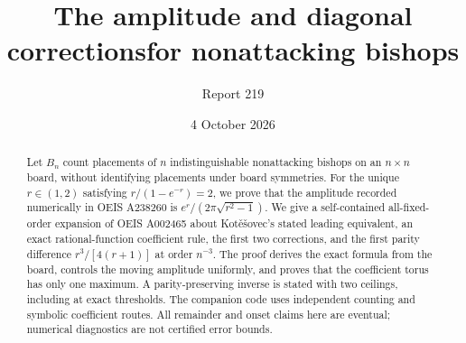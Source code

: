 \documentclass[11pt,letterpaper]{article}
\title{The amplitude and diagonal corrections\newline for nonattacking bishops}
\author{Report 219}
\date{4 October 2026}
\theoremstyle{remark}\newtheorem{remark}[theorem]{Remark}
\begin{document}
\maketitle
\begin{abstract}
Let $B_n$ count placements of $n$ indistinguishable nonattacking bishops on an $n\times n$ board, without identifying placements under board symmetries. For the unique $r\in(1,2)$ satisfying $r/(1-e^{-r})=2$, we prove that the amplitude recorded numerically in OEIS A238260 is $e^r/(2\pi\sqrt{r^2-1})$. We give a self-contained all-fixed-order expansion of OEIS A002465 about Kot\v e\v sovec's stated leading equivalent, an exact rational-function coefficient rule, the first two corrections, and the first parity difference $r^3/[4(r+1)]$ at order $n^{-3}$. The proof derives the exact formula from the board, controls the moving amplitude uniformly, and proves that the coefficient torus has only one maximum. A parity-preserving inverse is stated with two ceilings, including at exact thresholds. The companion code uses independent counting and symbolic coefficient routes. All remainder and onset claims here are eventual; numerical diagnostics are not certified error bounds.
\end{abstract}
\end{document}
